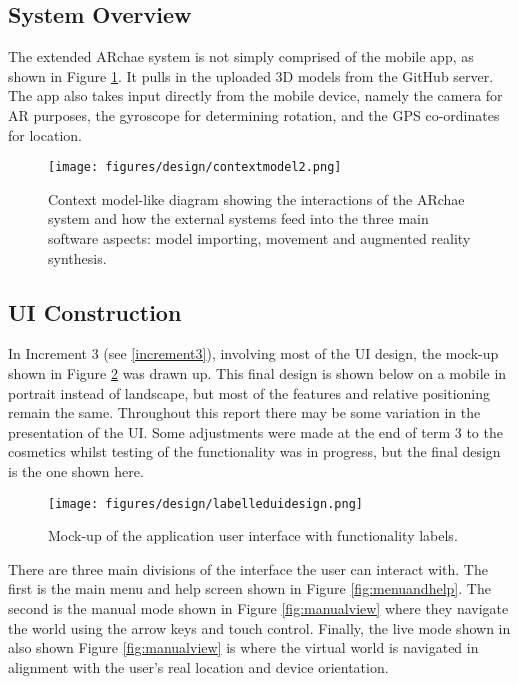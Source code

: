 \documentclass[12pt, a4paper]{article}
\begin{document}
\subsection{System Overview}
The extended ARchae system is not simply comprised of the mobile app, as shown in Figure \ref{fig:systemoverview}. It pulls in the uploaded 3D models from the GitHub server. The app also takes input directly from the mobile device, namely the camera for AR purposes, the gyroscope for determining rotation, and the GPS co-ordinates for location.

\begin{figure}[h!]
    \centering
    \texttt{[image: figures/design/contextmodel2.png]}
        \caption{Context model-like diagram showing the interactions of the ARchae system and how the external systems feed into the three main software aspects: model importing, movement and augmented reality synthesis.}
        \label{fig:systemoverview}
\end{figure}


\newpage
\subsection{UI Construction}
\label{uidesign}
In Increment 3 (see \ref{increment3}), involving most of the UI design, the mock-up shown in Figure \ref{fig:uimockup} was drawn up. This final design is shown below on a mobile in portrait instead of landscape, but most of the features and relative positioning remain the same. Throughout this report there may be some variation in the presentation of the UI. Some adjustments were made at the end of term 3 to the cosmetics whilst testing of the functionality was in progress, but the final design is the one shown here. 

\begin{figure}[h]
    \centering
    \texttt{[image: figures/design/labelleduidesign.png]}
        \caption{Mock-up of the application user interface with functionality labels.}
        \label{fig:uimockup}
\end{figure}

There are three main divisions of the interface the user can interact with. The first is the main menu and help screen shown in Figure \ref{fig:menuandhelp}. The second is the manual mode shown in Figure \ref{fig:manualview} where they navigate the world using the arrow keys and touch control. Finally, the live mode shown in also shown Figure \ref{fig:manualview} is where the virtual world is navigated in alignment with the user's real location and device orientation.
\end{document}
